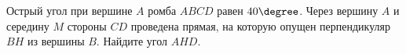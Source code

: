 \begin{ex}
	\begin{condition}
		Острый угол при вершине \( A  \) ромба \( ABCD  \) равен \( 40\degree \). Через	вершину \( A  \) и середину \( M  \) стороны \( CD  \) проведена прямая, на которую опущен перпендикуляр \( BH  \) из вершины \( B \). Найдите угол \( AHD \).
	\end{condition}
\end{ex}